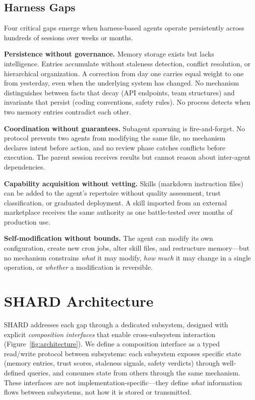 \documentclass[11pt]{article}
\begin{document}
\subsection{Harness Gaps}

Four critical gaps emerge when harness-based agents operate persistently across hundreds of sessions over weeks or months.

\textbf{Persistence without governance.} Memory storage exists but lacks intelligence. Entries accumulate without staleness detection, conflict resolution, or hierarchical organization. A correction from day one carries equal weight to one from yesterday, even when the underlying system has changed. No mechanism distinguishes between facts that decay (API endpoints, team structures) and invariants that persist (coding conventions, safety rules). No process detects when two memory entries contradict each other.

\textbf{Coordination without guarantees.} Subagent spawning is fire-and-forget. No protocol prevents two agents from modifying the same file, no mechanism declares intent before action, and no review phase catches conflicts before execution. The parent session receives results but cannot reason about inter-agent dependencies.

\textbf{Capability acquisition without vetting.} Skills (markdown instruction files) can be added to the agent's repertoire without quality assessment, trust classification, or graduated deployment. A skill imported from an external marketplace receives the same authority as one battle-tested over months of production use.

\textbf{Self-modification without bounds.} The agent can modify its own configuration, create new cron jobs, alter skill files, and restructure memory---but no mechanism constrains \emph{what} it may modify, \emph{how much} it may change in a single operation, or \emph{whether} a modification is reversible.

\section{SHARD Architecture}

SHARD addresses each gap through a dedicated subsystem, designed with explicit \emph{composition interfaces} that enable cross-subsystem interaction (Figure~\ref{fig:architecture}). We define a composition interface as a typed read/write protocol between subsystems: each subsystem exposes specific state (memory entries, trust scores, staleness signals, safety verdicts) through well-defined queries, and consumes state from others through the same mechanism. These interfaces are not implementation-specific---they define \emph{what} information flows between subsystems, not how it is stored or transmitted.
\end{document}
